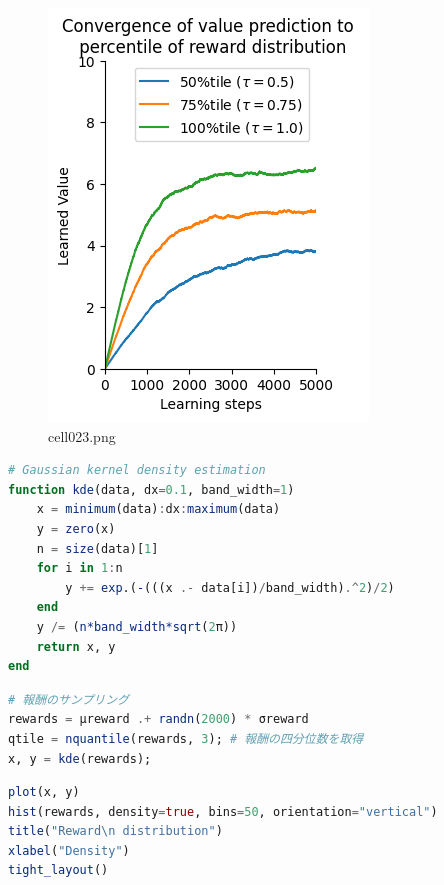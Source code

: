 \begin{figure}[ht]
	\centering
	\includegraphics[scale=0.8, max width=\linewidth]{./fig/bayesian-brain/quantile-expectile-regression/cell023.png}
	\caption{cell023.png}
	\label{cell023.png}
\end{figure}
\begin{lstlisting}[language=julia]
# Gaussian kernel density estimation
function kde(data, dx=0.1, band_width=1)
    x = minimum(data):dx:maximum(data)
    y = zero(x)
    n = size(data)[1]
    for i in 1:n
        y += exp.(-(((x .- data[i])/band_width).^2)/2)
    end
    y /= (n*band_width*sqrt(2π))
    return x, y
end
\end{lstlisting}
\begin{lstlisting}[language=julia]
# 報酬のサンプリング
rewards = μreward .+ randn(2000) * σreward
qtile = nquantile(rewards, 3); # 報酬の四分位数を取得
x, y = kde(rewards);
\end{lstlisting}
\begin{lstlisting}[language=julia]
plot(x, y)
hist(rewards, density=true, bins=50, orientation="vertical")
title("Reward\n distribution")
xlabel("Density")
tight_layout()
\end{lstlisting}
